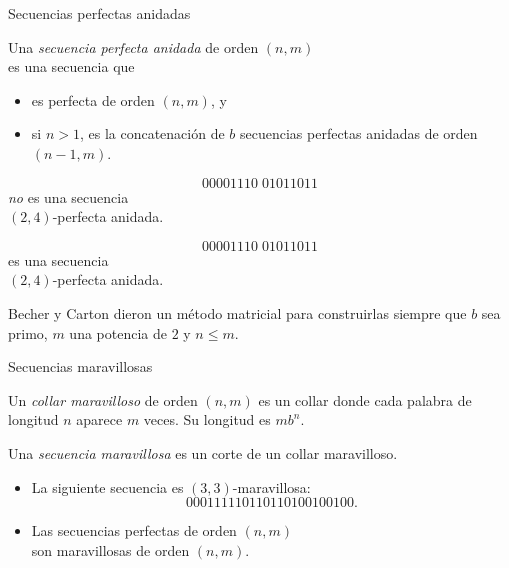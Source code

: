 \documentclass[spanish,xcolor={table}]{beamer}
\begin{document}
\begin{frame}{Secuencias perfectas anidadas}

\begin{definition}
  Una \emph{secuencia perfecta anidada} de orden $(n,m)$ \\
  es una secuencia que
  \begin{itemize}
    \item es perfecta de orden $(n,m)$, y
    \item si $n > 1$, es la concatenación de $b$ secuencias perfectas anidadas
    de orden $(n-1, m)$.
  \end{itemize}
\end{definition}

\begin{examples}
  \vspace{-1.2em}
  \begin{multicols}{2}
    \[ 00001110 \; 01011011 \]
    \emph{no} es una secuencia \\ $(2,4)$-perfecta anidada.

    \columnbreak

    \[ 00001110 \; 01011011 \]
    es una secuencia \\ $(2,4)$-perfecta anidada.
  \end{multicols}
\end{examples}

\medskip

Becher y Carton dieron un método matricial para construirlas siempre
que $b$ sea primo, $m$ una potencia de $2$ y $n \leq m$.
\end{frame}


\begin{frame}{Secuencias maravillosas}

\begin{definition}
  Un \emph{collar maravilloso} de orden $(n,m)$ es un collar donde cada palabra de longitud $n$ aparece $m$ veces. Su longitud es $mb^n$.

  \medskip

  Una \emph{secuencia maravillosa} es un corte de un collar maravilloso.
\end{definition}

\begin{examples}
  \begin{itemize}
  \item La siguiente secuencia es $(3,3)$-maravillosa: \vspace{-.5em}
  \[ 000111110110110100100100. \]
  \item Las secuencias perfectas de orden $(n,m)$ \\
  son maravillosas de orden $(n,m)$.
  \end{itemize}
\end{examples}

\end{frame}
\end{document}
